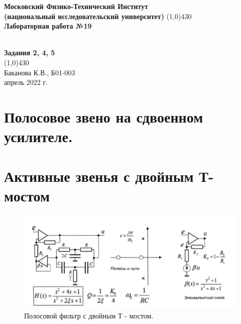 \documentclass[a4paper, 12pt]{article}%
\begin{document}
\begin{titlepage}

\begin{center}
\large\textbf{Московский Физико-Технический Институт}\\
\large\textbf{(национальный исследовательский университет)}
\vfill
\line(1,0){430}\\[3mm]
\huge\textbf{Лабораторная работа №19}\\
\item{   }\\
\large\textbf{Задания 2, 4, 5}\\
\line(1,0){430}\\[1mm]
\vfill
\large Баканова К.В., Б01-003\\
\large апрель 2022 г.\\
\end{center}

\end{titlepage}


\section{Полосовое звено на сдвоенном усилителе.}

\newpage
{}
\section{Активные звенья с двойным Т-мостом}


\begin{figure}[h!]
    \centering
    \includegraphics[width=1\linewidth]{pic5.png} 
    \caption{Полосовой фильтр с двойным Т - мостом.}
\end{figure}

\subsection{}
\end{document}
